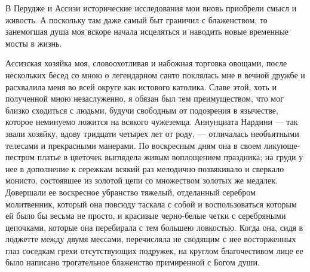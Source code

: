 В Перудже и Ассизи исторические исследования мои вновь приобрели смысл
и  живость. А  поскольку там  даже самый  быт граничил  с блаженством,
то  занемогшая душа  моя  вскоре начала  исцеляться  и наводить  новые
временные мосты в жизнь.

Ассизская  хозяйка моя,  словоохотливая и  набожная торговка  овощами,
после нескольких  бесед со  мною о легендарном  санто поклялась  мне в
вечной дружбе и расхвалила меня  во всей округе как истового католика.
Славе  этой, хоть  и полученной  мною незаслуженно,  я обязан  был тем
преимуществом,  что мог  близко сходиться  с людьми,  будучи свободным
от  подозрения  в  язычестве,  которое неминуемо  ложится  на  всякого
чужеземца. Аннунциата  Нардини ---  так звали хозяйку,  вдову тридцати
четырех лет от роду, --- отличалась необъятными телесами и прекрасными
манерами.  По воскресным  дням она  в своем  ликующе-пестром платье  в
цветочек  выглядела живым  воплощением  праздника; на  груди  у нее  в
дополнение  к сережкам  всякий  раз мелодично  позвякивало и  сверкало
монисто, состоявшее из золотой цепи  со множеством золотых же медалек.
Довершали  ее   воскресное  убранство  тяжелый,   отделанный  серебром
молитвенник,  который она  повсюду таскала  с собой  и воспользоваться
которым  ей было  бы весьма  не просто,  и красивые  черно-белые четки
с  серебряными  цепочками,  которые   она  перебирала  с  тем  большею
ловкостью. Когда она, сидя в лоджетте между двумя мессами, перечисляла
не  сводящим  с нее  восторженных  глаз  соседкам грехи  отсутствующих
подружек, на круглом благочестивом  лице ее было написано трогательное
блаженство примиренной с Богом души.

